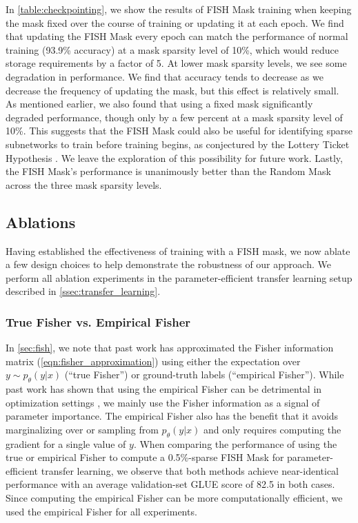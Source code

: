 In \ref{table:checkpointing}, we show the results of FISH Mask training when keeping the mask fixed over the course of training or updating it at each epoch. We find that updating the FISH Mask every epoch can match the performance of normal training (93.9\% accuracy) at a mask sparsity level of 10\%, which would reduce storage requirements by a factor of 5. At lower mask sparsity levels, we see some degradation in performance. We find that accuracy tends to decrease as we decrease the frequency of updating the mask, but this effect is relatively small. As mentioned earlier, we also found that using a fixed mask significantly degraded performance, though only by a few percent at a mask sparsity level of 10\%.
This suggests that the FISH Mask could also be useful for identifying sparse subnetworks to train before training begins, as conjectured by the Lottery Ticket Hypothesis \cite{frankle2018lottery}. We leave the exploration of this possibility for future work. Lastly, the FISH Mask's performance is unanimously better than the Random Mask across the three mask sparsity levels. 

\subsection{Ablations}

Having established the effectiveness of training with a FISH mask, we now ablate a few design choices to help demonstrate the robustness of our approach. We perform all ablation experiments in the parameter-efficient transfer learning setup described in \ref{ssec:transfer_learning}.

\subsubsection{True Fisher vs. Empirical Fisher}
\label{sec:empirical-ablation}

In \ref{sec:fish}, we note that past work has approximated the Fisher information matrix (\ref{eqn:fisher_approximation}) using either the expectation over $y \sim p_\theta(y | x)$ (``true Fisher'') or ground-truth labels (``empirical Fisher''). While past work has shown that using the empirical Fisher can be detrimental in optimization settings \cite{martens2014new,kunstner2019limitations}, we mainly use the Fisher information as a signal of parameter importance. The empirical Fisher also has the benefit that it avoids marginalizing over or sampling from $p_\theta(y | x)$ and only requires computing the gradient for a single value of $y$. When comparing the performance of using the true or empirical Fisher to compute a 0.5\%-sparse FISH Mask for parameter-efficient transfer learning, we observe that both methods achieve near-identical performance with an average validation-set GLUE score of 82.5 in both cases. Since computing the empirical Fisher can be more computationally efficient, we used the empirical Fisher for all experiments.

